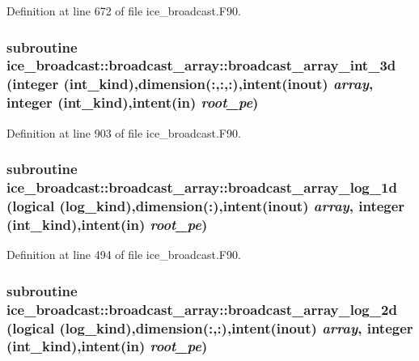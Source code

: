 Definition at line 672 of file ice\_\-broadcast.F90.\hypertarget{interfaceice__broadcast_1_1broadcast__array_a6415e378f646e0ddc5a04611f35bcf2e}{
\subsubsection[{broadcast\_\-array\_\-int\_\-3d}]{\setlength{\rightskip}{0pt plus 5cm}subroutine ice\_\-broadcast::broadcast\_\-array::broadcast\_\-array\_\-int\_\-3d (integer (int\_\-kind),dimension(:,:,:),intent(inout) {\em array}, \/  integer (int\_\-kind),intent(in) {\em root\_\-pe})}}
\label{interfaceice__broadcast_1_1broadcast__array_a6415e378f646e0ddc5a04611f35bcf2e}


Definition at line 903 of file ice\_\-broadcast.F90.\hypertarget{interfaceice__broadcast_1_1broadcast__array_a231910fe6811b349e3ceaa4b2745158a}{
\subsubsection[{broadcast\_\-array\_\-log\_\-1d}]{\setlength{\rightskip}{0pt plus 5cm}subroutine ice\_\-broadcast::broadcast\_\-array::broadcast\_\-array\_\-log\_\-1d (logical (log\_\-kind),dimension(:),intent(inout) {\em array}, \/  integer (int\_\-kind),intent(in) {\em root\_\-pe})}}
\label{interfaceice__broadcast_1_1broadcast__array_a231910fe6811b349e3ceaa4b2745158a}


Definition at line 494 of file ice\_\-broadcast.F90.\hypertarget{interfaceice__broadcast_1_1broadcast__array_ae6430f78293683f61bcea46c38e9a2cd}{
\subsubsection[{broadcast\_\-array\_\-log\_\-2d}]{\setlength{\rightskip}{0pt plus 5cm}subroutine ice\_\-broadcast::broadcast\_\-array::broadcast\_\-array\_\-log\_\-2d (logical (log\_\-kind),dimension(:,:),intent(inout) {\em array}, \/  integer (int\_\-kind),intent(in) {\em root\_\-pe})}}
\label{interfaceice__broadcast_1_1broadcast__array_ae6430f78293683f61bcea46c38e9a2cd}


